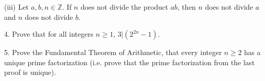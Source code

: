 \documentclass{article}
\theoremstyle{remark} %
\newcommand{\Z}{{\mathbb{Z}}}
\begin{document}
\vspace{7cm} %




(iii) Let $a,b,n \in \Z$. If $n$ does not divide the product $ab$, then $n$ does not divide $a$ and $n$ does not divide $b$.

\vspace{7cm} %




4. Prove that for all integers $n \geq 1$, $3|(2^{2n}-1)$.

\vspace{12cm} %




5. Prove the Fundamental Theorem of Arithmetic, that every integer $n \geq 2$ has a unique prime factorization (i.e. prove that the prime factorization from the last proof is unique).

\vspace{13cm} %

\end{document}

